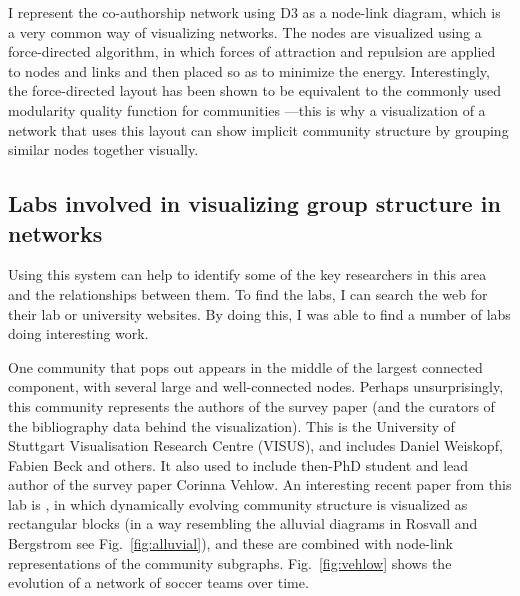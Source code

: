 I represent the co-authorship network using D3
\autocite{bostock_d3:_2011} as a node-link diagram, which is a very
common way of visualizing networks. The nodes are visualized using a
force-directed algorithm, in which forces of attraction and repulsion
are applied to nodes and links and then placed so as to minimize the
energy. Interestingly, the force-directed layout has been shown to be
equivalent to the commonly used modularity quality function for
communities \autocite{noack_modularity_2009}---this is why a
visualization of a network that uses this layout can show implicit
community structure by grouping similar nodes together visually.

\subsection{Labs involved in visualizing group structure in
networks}\label{labs-involved-in-visualizing-group-structure-in-networks}

Using this system can help to identify some of the key researchers in
this area and the relationships between them. To find the labs, I can
search the web for their lab or university websites. By doing this, I
was able to find a number of labs doing interesting work.

One community that pops out appears in the middle of the largest
connected component, with several large and well-connected nodes.
Perhaps unsurprisingly, this community represents the authors of the
survey paper (and the curators of the bibliography data behind the
visualization). This is the University of Stuttgart Visualisation
Research Centre (VISUS), and includes Daniel Weiskopf, Fabien Beck and
others. It also used to include then-PhD student and lead author of the
survey paper Corinna Vehlow. An interesting recent paper from this lab
is \autocite{vehlow_visualizing_2015}, in which dynamically evolving
community structure is visualized as rectangular blocks (in a way
resembling the alluvial diagrams in Rosvall and Bergstrom
\autocite{rosvall_mapping_2010} see Fig.~\ref{fig:alluvial}), and these
are combined with node-link representations of the community subgraphs.
Fig.~\ref{fig:vehlow} shows the evolution of a network of soccer teams
over time.

